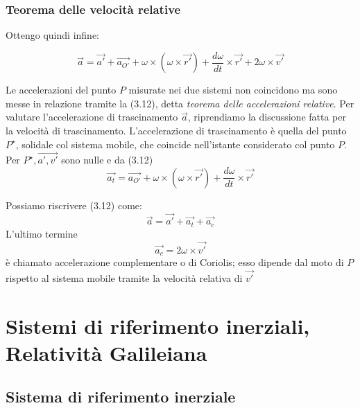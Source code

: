 \documentclass[class=book, crop=false, oneside, 12pt]{standalone}
\begin{document}
\subsubsection{Teorema delle velocità relative}

Ottengo quindi infine:

\begin{equation}
    \overrightarrow{a} = \overrightarrow{a'} + \overrightarrow{a_{O'}} + \omega \times ( \omega \times \overrightarrow{r'}) + \frac{d \omega}{dt} \times \overrightarrow{r'} + 2 \omega \times \overrightarrow{v'}
\end{equation}

Le accelerazioni del punto \(P\) misurate nei due sistemi non coincidono ma sono messe in relazione tramite la (3.12), detta \emph{teorema delle accelerazioni relative}.
Per valutare l'accelerazione di trascinamento \(\overrightarrow{a}\), riprendiamo la discussione fatta per la velocità di trascinamento. 
L'accelerazione di trascinamento è quella del punto \(P^{\star}\), solidale col sistema mobile, che coincide nell'istante considerato col punto \(P\). 
Per \(P^{\star}, \overrightarrow{a', v'}\) sono nulle e da (3.12)
\begin{equation}
    \overrightarrow{a_t} = \overrightarrow{a_{O'}} + \omega \times (\omega \times \overrightarrow{r'}) + \frac{d \omega }{dt} \times \overrightarrow{r'}
\end{equation}

Possiamo riscrivere (3.12) come:
\begin{equation}
    \overrightarrow{a} = \overrightarrow{a'} + \overrightarrow{a_t} + \overrightarrow{a_c}
\end{equation}
L'ultimo termine
\begin{equation}
    \overrightarrow{a_c} = 2 \omega \times \overrightarrow{v'}
\end{equation}
è chiamato accelerazione complementare o di Coriolis; esso dipende dal moto di \(P\) rispetto al sistema mobile tramite la velocità relativa di \(\overrightarrow{v'}\)

\section{Sistemi di riferimento inerziali, Relatività Galileiana}

\subsection{Sistema di riferimento inerziale}
\end{document}
